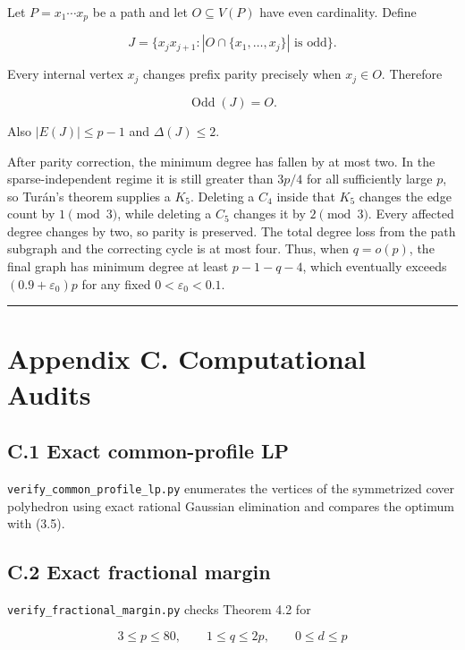 \documentclass[
  american,
  11pt,
  a4paper,
]{article}
\begin{document}
Let \(P=x_1\cdots x_p\) be a path and let \(O\subseteq V(P)\) have even cardinality. Define

\[
J=\{x_jx_{j+1}:|O\cap\{x_1,\ldots,x_j\}|\text{ is odd}\}.
\]

Every internal vertex \(x_j\) changes prefix parity precisely when \(x_j\in O\). Therefore

\[
\operatorname{Odd}(J)=O.
\]

Also \(|E(J)|\le p-1\) and \(\Delta(J)\le2\).

After parity correction, the minimum degree has fallen by at most two. In the sparse-independent regime it is still greater than \(3p/4\) for all sufficiently large \(p\), so Turán's theorem supplies a \(K_5\). Deleting a \(C_4\) inside that \(K_5\) changes the edge count by \(1\pmod3\), while deleting a \(C_5\) changes it by \(2\pmod3\). Every affected degree changes by two, so parity is preserved. The total degree loss from the path subgraph and the correcting cycle is at most four. Thus, when \(q=o(p)\), the final graph has minimum degree at least \(p-1-q-4\), which eventually exceeds \((0.9+\varepsilon_0)p\) for any fixed \(0<\varepsilon_0<0.1\).

\begin{center}\rule{0.5\linewidth}{0.5pt}\end{center}

\section{Appendix C. Computational Audits}\label{appendix-c.-computational-audits}

\subsection{C.1 Exact common-profile LP}\label{c.1-exact-common-profile-lp}

\texttt{verify\_common\_profile\_lp.py} enumerates the vertices of the symmetrized cover polyhedron using exact rational Gaussian elimination and compares the optimum with (3.5).

\subsection{C.2 Exact fractional margin}\label{c.2-exact-fractional-margin}

\texttt{verify\_fractional\_margin.py} checks Theorem 4.2 for

\[
3\le p\le80,
\qquad
1\le q\le2p,
\qquad
0\le d\le p
\]
\end{document}
